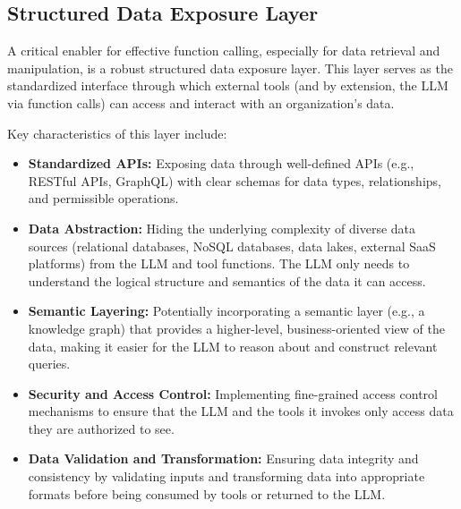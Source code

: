 \documentclass[10pt, a4paper]{article}
\begin{document}
\subsection{Structured Data Exposure Layer}
A critical enabler for effective function calling, especially for data retrieval and manipulation, is a robust structured data exposure layer. This layer serves as the standardized interface through which external tools (and by extension, the LLM via function calls) can access and interact with an organization's data.

Key characteristics of this layer include:
\begin{itemize}
    \item \textbf{Standardized APIs:} Exposing data through well-defined APIs (e.g., RESTful APIs, GraphQL) with clear schemas for data types, relationships, and permissible operations.
    \item \textbf{Data Abstraction:} Hiding the underlying complexity of diverse data sources (relational databases, NoSQL databases, data lakes, external SaaS platforms) from the LLM and tool functions. The LLM only needs to understand the logical structure and semantics of the data it can access.
    \item \textbf{Semantic Layering:} Potentially incorporating a semantic layer (e.g., a knowledge graph) that provides a higher-level, business-oriented view of the data, making it easier for the LLM to reason about and construct relevant queries.
    \item \textbf{Security and Access Control:} Implementing fine-grained access control mechanisms to ensure that the LLM and the tools it invokes only access data they are authorized to see.
    \item \textbf{Data Validation and Transformation:} Ensuring data integrity and consistency by validating inputs and transforming data into appropriate formats before being consumed by tools or returned to the LLM.
\end{itemize}
\end{document}
